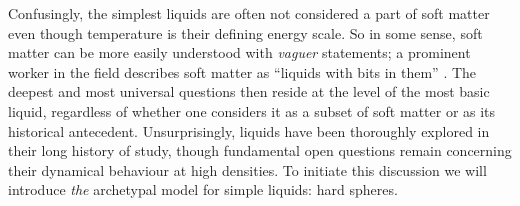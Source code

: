 \documentclass[11pt,twoside]{report}
\begin{document}
Confusingly, the simplest liquids%
are often not considered a part of soft matter even though temperature is their defining energy scale.
So in some sense, soft matter can be more easily understood with \emph{vaguer} statements; a prominent worker in the field describes soft matter as ``liquids with bits in them'' \cite{Poon2018}.
The deepest and most universal questions then reside at the level of the most basic liquid, regardless of whether one considers it as a subset of soft matter or as its historical antecedent.
Unsurprisingly, liquids have been thoroughly explored in their long history of study, though fundamental open questions remain concerning their dynamical behaviour at high densities.
To initiate this discussion we will introduce \emph{the} archetypal model for simple liquids: hard spheres.
\end{document}
